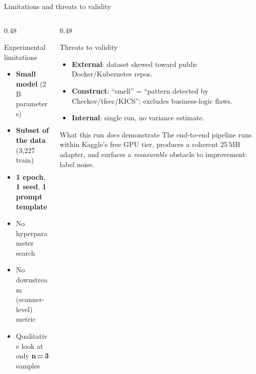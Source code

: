 \documentclass[aspectratio=169, 10pt]{beamer}
\begin{document}
\begin{frame}{Limitations and threats to validity}
  \begin{columns}[T]
    \begin{column}{0.48\textwidth}
      \begin{alertblock}{Experimental limitations}
        \scriptsize
        \begin{itemize}
          \item \textbf{Small model} (2\,B parameters)
          \item \textbf{Subset of the data} (3{,}227 train)
          \item \textbf{1 epoch}, \textbf{1 seed}, \textbf{1 prompt template}
          \item No hyperparameter search
          \item No downstream (scanner-level) metric
          \item Qualitative look at only \textbf{n\,=\,3} samples
        \end{itemize}
      \end{alertblock}
    \end{column}
    \begin{column}{0.48\textwidth}
      \begin{block}{Threats to validity}
        \scriptsize
        \begin{itemize}
          \item \textbf{External}: dataset skewed toward public
                Docker/Kubernetes repos.
          \item \textbf{Construct}: ``smell'' = ``pattern detected by
                Checkov/tfsec/KICS''; excludes business-logic flaws.
          \item \textbf{Internal}: single run, no variance estimate.
        \end{itemize}
      \end{block}
      \begin{exampleblock}{What this run \emph{does} demonstrate}
        \scriptsize
        The end-to-end pipeline runs within Kaggle's free GPU tier,
        produces a coherent 25\,MB adapter, and surfaces a
        \emph{measurable} obstacle to improvement: label noise.
      \end{exampleblock}
    \end{column}
  \end{columns}
\end{frame}

\end{document}
